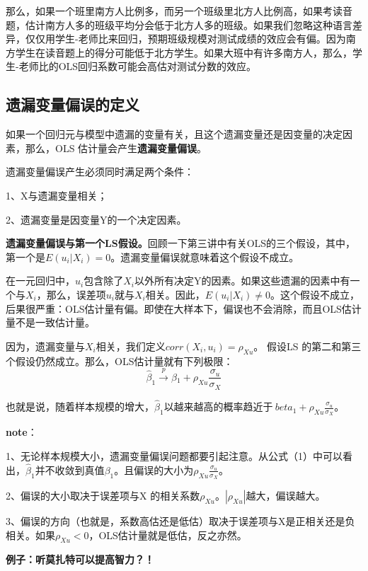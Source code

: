 \documentclass[cn,12pt,math=newtx,citestyle=gb7714-2015,bibstyle=gb7714-2015]{elegantbook}
\begin{document}
	那么，如果一个班里南方人比例多，而另一个班级里北方人比例高，如果考读音题，估计南方人多的班级平均分会低于北方人多的班级。如果我们忽略这种语言差异，仅仅用学生-老师比来回归，预期班级规模对测试成绩的效应会有偏。因为南方学生在读音题上的得分可能低于北方学生。如果大班中有许多南方人，那么，学生-老师比的OLS回归系数可能会高估对测试分数的效应。
	
	\subsection{遗漏变量偏误的定义}
	如果一个回归元与模型中遗漏的变量有关，且这个遗漏变量还是因变量的决定因素，那么，OLS 估计量会产生\textbf{遗漏变量偏误}。
	
	遗漏变量偏误产生必须同时满足两个条件：
	
	1、X与遗漏变量相关；
	
	2、遗漏变量是因变量Y的一个决定因素。
	
	\textbf{遗漏变量偏误与第一个LS假设。}回顾一下第三讲中有关OLS的三个假设，其中，第一个是$E(u_i|X_i)=0$。遗漏变量偏误就意味着这个假设不成立。
	
	在一元回归中，$u_i$包含除了$X_i$以外所有决定Y的因素。如果这些遗漏的因素中有一个与$X_i$，那么，误差项$u_i$就与$X_i$相关。因此，$E(u_i|X_i)\neq0$。这个假设不成立，后果很严重：OLS估计量有偏。即使在大样本下，偏误也不会消除，而且OLS估计量不是一致估计量。
	
	因为，遗漏变量与$X_i$相关，我们定义$corr(X_i,u_i)=\rho_{Xu}$。 假设LS 的第二和第三个假设仍然成立。那么，OLS估计量就有下列极限：
	\begin{equation}
		\hat{\beta}_1\xrightarrow{p}\beta{_1}+\rho_{Xu}\frac{\sigma{_u}}{\sigma{_X}}
	\end{equation}
	
	也就是说，随着样本规模的增大，$\hat{\beta}_1$以越来越高的概率趋近于$\ beta{_1}+\rho_{Xu}\frac{\sigma{_u}}{\sigma{_X}}$。
	
	\textbf{note}：
	
	1、无论样本规模大小，遗漏变量偏误问题都要引起注意。从公式（1）中可以看出，$\hat{\beta}_1$并不收敛到真值$\beta_1$。且偏误的大小为$\rho_{Xu}\frac{\sigma{_u}}{\sigma{_X}}$。
	
	2、偏误的大小取决于误差项与X 的相关系数$\rho_{Xu}$。$|\rho_{Xu}|$越大，偏误越大。
	
	3、偏误的方向（也就是，系数高估还是低估）取决于误差项与X是正相关还是负相关。如果$\rho_{Xu}<0$，OLS估计量就是低估，反之亦然。
	
	\textbf{例子：听莫扎特可以提高智力？！}
	
\end{document}
